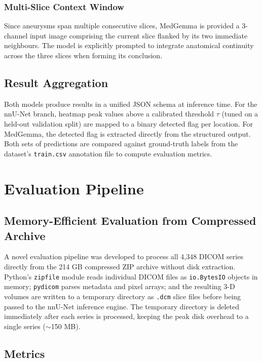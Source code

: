 \documentclass[journal]{IEEEtran}
\begin{document}
\subsubsection{Multi-Slice Context Window}
Since aneurysms span multiple consecutive slices, MedGemma is provided a
3-channel input image comprising the current slice flanked by its two
immediate neighbours. The model is explicitly prompted to integrate anatomical
continuity across the three slices when forming its conclusion.

\subsection{Result Aggregation}

Both models produce results in a unified JSON schema at inference time. For the
nnU-Net branch, heatmap peak values above a calibrated threshold $\tau$ (tuned
on a held-out validation split) are mapped to a binary detected flag per
location. For MedGemma, the detected flag is extracted directly from the
structured output. Both sets of predictions are compared against ground-truth
labels from the dataset's \texttt{train.csv} annotation file to compute
evaluation metrics.

\section{Evaluation Pipeline}
\label{sec:eval}

\subsection{Memory-Efficient Evaluation from Compressed Archive}

A novel evaluation pipeline was developed to process all 4,348 DICOM series
directly from the 214 GB compressed ZIP archive without disk extraction.
Python's \texttt{zipfile} module reads individual DICOM files as
\texttt{io.BytesIO} objects in memory; \texttt{pydicom} parses metadata and
pixel arrays; and the resulting 3-D volumes are written to a temporary directory
as \texttt{.dcm} slice files before being passed to the nnU-Net inference
engine. The temporary directory is deleted immediately after each series is
processed, keeping the peak disk overhead to a single series ($\sim$150 MB).

\subsection{Metrics}
\end{document}
